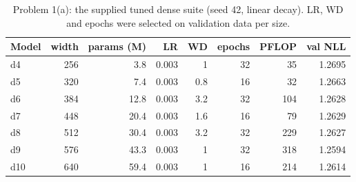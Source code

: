 \begin{table}[H]\centering\small\caption{Problem 1(a): the supplied tuned dense suite (seed 42, linear decay). LR, WD and epochs were selected on validation data per size.}\label{tab:p1}
\begin{tabular}{lrrrrrrr}\toprule Model & width & params (M) & LR & WD & epochs & PFLOP & val NLL \\ \midrule
d4 & 256 & 3.8 & 0.003 & 1 & 32 & 35 & 1.2695 \\
d5 & 320 & 7.4 & 0.003 & 0.8 & 16 & 32 & 1.2663 \\
d6 & 384 & 12.8 & 0.003 & 3.2 & 32 & 104 & 1.2628 \\
d7 & 448 & 20.4 & 0.003 & 1.6 & 16 & 79 & 1.2629 \\
d8 & 512 & 30.4 & 0.003 & 3.2 & 32 & 229 & 1.2627 \\
d9 & 576 & 43.3 & 0.003 & 1 & 32 & 318 & 1.2594 \\
d10 & 640 & 59.4 & 0.003 & 1 & 16 & 214 & 1.2614 \\
\bottomrule\end{tabular}\end{table}
